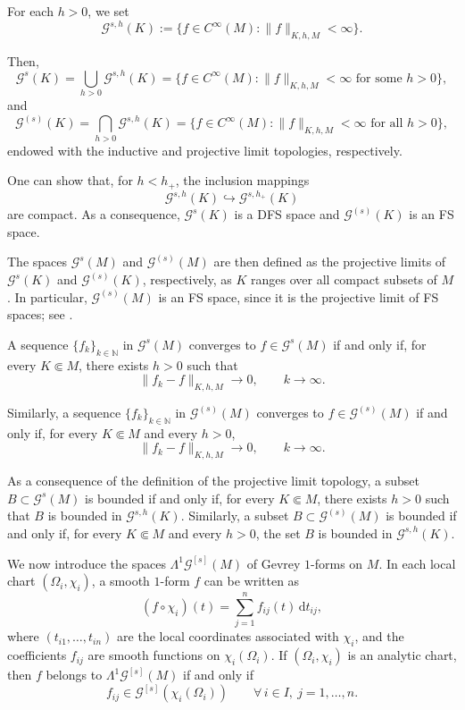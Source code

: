 \documentclass[11pt,reqno]{amsart}
\numberwithin{equation}{section}
\begin{document}
	For each $h>0$, we set
	\[
	\mathscr{G}^{s,h}(K) := \{ f\in C^\infty(M) : \|f\|_{K,h,M}<\infty \}.
	\]
	
	Then,
	\[
	\mathscr{G}^s(K)
	= \bigcup_{h>0}\mathscr{G}^{s,h}(K)
	= \{ f\in C^\infty(M) : \|f\|_{K,h,M}<\infty \text{ for some } h>0 \},
	\]
	and
	\[
	\mathscr{G}^{(s)}(K)
	= \bigcap_{h>0}\mathscr{G}^{s,h}(K)
	= \{ f\in C^\infty(M) : \|f\|_{K,h,M}<\infty \text{ for all } h>0 \},
	\]
	endowed with the inductive and projective limit topologies, respectively.
	
	One can show that, for $h<h_+$, the inclusion mappings
	\[
	\mathscr{G}^{s,h}(K)\hookrightarrow \mathscr{G}^{s,h_+}(K)
	\]
	are compact. As a consequence, $\mathscr{G}^s(K)$ is a DFS space and
	$\mathscr{G}^{(s)}(K)$ is an FS space.
	
	The spaces $\mathscr{G}^s(M)$ and $\mathscr{G}^{(s)}(M)$ are then defined as the projective limits of $\mathscr{G}^s(K)$ and $\mathscr{G}^{(s)}(K)$, respectively, as $K$ ranges over all compact subsets of $M$. In particular, $\mathscr{G}^{(s)}(M)$ is an FS space, since it is the projective limit of FS spaces; see \cite{Komatsu1967}.
	
	A sequence $\{f_k\}_{k\in\mathbb{N}}$ in $\mathscr{G}^s(M)$ converges to $f\in\mathscr{G}^s(M)$ if and only if, for every $K\Subset M$, there exists $h>0$ such that
	\[
	\|f_k-f\|_{K,h,M} \to 0,\qquad k\to\infty.
	\]
	
	Similarly, a sequence $\{f_k\}_{k\in\mathbb{N}}$ in $\mathscr{G}^{(s)}(M)$ converges to $f\in\mathscr{G}^{(s)}(M)$ if and only if, for every $K\Subset M$ and every $h>0$,
	\[
	\|f_k-f\|_{K,h,M} \to 0,\qquad k\to\infty.
	\]
	
	As a consequence of the definition of the projective limit topology, a subset
	$B\subset \mathscr{G}^s(M)$ is bounded if and only if, for every $K\Subset M$, there exists $h>0$ such that $B$ is bounded in $\mathscr{G}^{s,h}(K)$. Similarly, a subset $B\subset \mathscr{G}^{(s)}(M)$ is bounded if and only if, for every $K\Subset M$ and every $h>0$, the set $B$ is bounded in $\mathscr{G}^{s,h}(K)$.
	
	We now introduce the spaces $\mathsf{\Lambda}^1\mathscr{G}^{[s]}(M)$ of Gevrey $1$-forms on $M$. In each local chart $(\Omega_i,\chi_i)$, a smooth $1$-form $f$ can be written as
	\[
	(f\circ\chi_i)(t) = \sum_{j=1}^n f_{ij}(t)\,\mathrm{d}t_{ij},
	\]
	where $(t_{i1},\dots,t_{in})$ are the local coordinates associated with $\chi_i$, and the coefficients $f_{ij}$ are smooth functions on $\chi_i(\Omega_i)$. If $(\Omega_i,\chi_i)$ is an analytic chart, then $f$ belongs to $\mathsf{\Lambda}^1\mathscr{G}^{[s]}(M)$ if and only if
	\[
	f_{ij}\in\mathscr{G}^{[s]}(\chi_i(\Omega_i))
	\qquad \forall\, i\in I,\ j=1,\dots,n.
	\]
	
\end{document}
